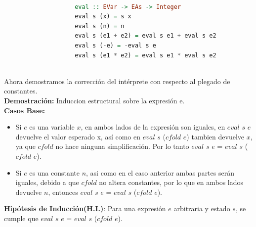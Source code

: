 \documentclass{article}
\begin{document}
\begin{itemize}
\begin{itemize}
                \begin{lstlisting}[language=Haskell]
                
                    eval :: EVar -> EAs -> Integer
                    eval s (x) = s x  
                    eval s (n) = n    
                    eval s (e1 + e2) = eval s e1 + eval s e2 
                    eval s (-e) = -eval s e                 
                    eval s (e1 * e2) = eval s e1 * eval s e2
                    
                \end{lstlisting}    
                Ahora demostramos la corrección del intérprete con respecto al plegado de constantes.\\

                \textbf{Demostración:} Induccion estructural sobre la expresión e.\\
                
                \textbf{Casos Base:}
                \begin{itemize}
                \item Si $e$ es una variable $x$, en ambos lados de la expresión son iguales, en $eval$ $s$ $e$ devuelve el valor esperado x, así como en $eval$ $s$ ($cfold$ $e$) tambien devuelve $x$, ya que $cfold$ no hace ninguna simplificación. Por lo tanto $eval$ $s$ $e$ = $eval$ $s$ ($cfold$ $e$).\\

                \item Si $e$ es una constante $n$, asi como en el caso anterior ambas partes serán iguales, debido a que $cfold$ no altera constantes, por lo que en ambos lados devuelve $n$, entonces $eval$ $s$ $e$ = $eval$ $s$ ($cfold$ $e$).\\
                \end{itemize}

                \textbf{Hipótesis de Inducción(H.I.)}: Para una expresión $e$ arbitraria y estado $s$, se cumple que $eval$ $s$ $e$ = $eval$ $s$ ($cfold$ $e$).\\


\end{itemize}
\end{itemize}
\end{document}
